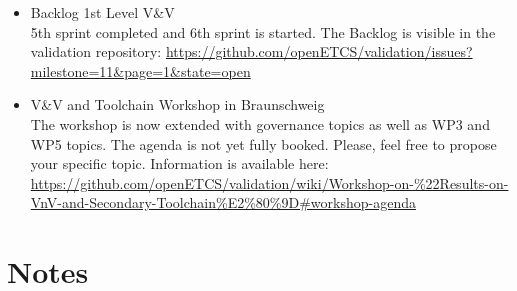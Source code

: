 \documentclass[a4paper, 11pt]{article}
\begin{document}
\begin{itemize}
\item Backlog 1st Level V\&V\\
5th sprint completed and 6th sprint is started. 
The Backlog is visible in the validation repository:
\url{https://github.com/openETCS/validation/issues?milestone=11&page=1&state=open}\\

\item V\&V and Toolchain Workshop in Braunschweig\\
The workshop is now extended with governance topics as well as WP3 and WP5 topics. The agenda is not yet fully booked. Please, feel free to propose your specific topic. Information is available here: \url{https://github.com/openETCS/validation/wiki/Workshop-on-%22Results-on-VnV-and-Secondary-Toolchain%E2%80%9D#workshop-agenda}\\

\end{itemize}


\section{Notes}
\end{document}
